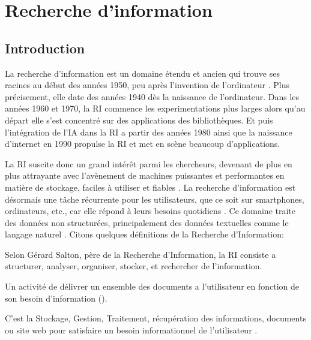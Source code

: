 
\section{Recherche d'information}
\subsection{Introduction}
La recherche d'information est un domaine étendu et ancien qui trouve ses racines au début des années 1950, peu après l'invention de l'ordinateur \citep{approche-semantique}. Plus précisement, elle date des années 1940 dès la naissance de l'ordinateur. Dans les années 1960 et 1970, la RI commence les experimentations plus larges alors qu'au départ elle s'est concentré sur des applications des bibliothèques. Et puis l'intégration de l'IA dans la RI a partir des années 1980 ainsi que la naissance d'internet en 1990 propulse la RI et met en scène beaucoup d'applications. \citep{salton1989automatique}

La RI suscite donc un grand intérêt parmi les chercheurs, devenant de plus en plus attrayante avec l'avènement de machines puissantes et performantes en matière de stockage, faciles à utiliser et fiables \citep{evaluation-of-ir-system}. La recherche d'information est désormais une tâche récurrente pour les utilisateurs, que ce soit sur smartphones, ordinateurs, etc., car elle répond à leurs besoins quotidiens \citep{thesaurus-ir-web}. Ce domaine traite des données non structurées, principalement des données textuelles comme le langage naturel \citep{modern-ir}.
Citons quelques définitions de la Recherche d'Information:

\begin{definition}
    Selon Gérard Salton, père de la Recherche d'Information, la RI consiste a structurer, analyser, organiser, stocker, et rechercher de l'information. \citep{thesaurus-ir-web}
\end{definition}

\begin{definition}
    Un activité de délivrer un ensemble des documents a l'utilisateur en fonction de son besoin d'information (\cite{thesaurus-ir-web}).
\end{definition}

\begin{definition}
    C'est la Stockage, Gestion, Traitement, récupération des informations, documents ou site web pour satisfaire un besoin informationnel de l'utilisateur \citep{vsm-for-arabic-language}.
\end{definition}

